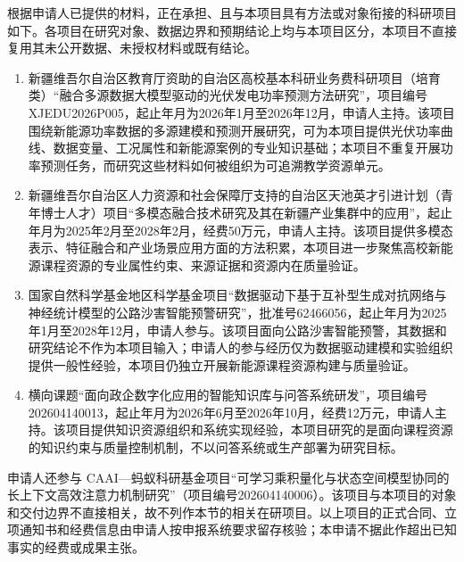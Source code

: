 \justifying
\NSFCBodyText

根据申请人已提供的材料，正在承担、且与本项目具有方法或对象衔接的科研项目如下。各项目在研究对象、数据边界和预期结论上均与本项目区分，本项目不直接复用其未公开数据、未授权材料或既有结论。

\begin{enumerate}
  \item 新疆维吾尔自治区教育厅资助的自治区高校基本科研业务费科研项目（培育类）“融合多源数据大模型驱动的光伏发电功率预测方法研究”，项目编号 XJEDU2026P005，起止年月为2026年1月至2026年12月，申请人主持。该项目围绕新能源功率数据的多源建模和预测开展研究，可为本项目提供光伏功率曲线、数据变量、工况属性和新能源案例的专业知识基础；本项目不重复开展功率预测任务，而研究这些材料如何被组织为可追溯教学资源单元。
  \item 新疆维吾尔自治区人力资源和社会保障厅支持的自治区天池英才引进计划（青年博士人才）项目“多模态融合技术研究及其在新疆产业集群中的应用”，起止年月为2025年2月至2028年2月，经费50万元，申请人主持。该项目提供多模态表示、特征融合和产业场景应用方面的方法积累，本项目进一步聚焦高校新能源课程资源的专业属性约束、来源证据和资源内在质量验证。
  \item 国家自然科学基金地区科学基金项目“数据驱动下基于互补型生成对抗网络与神经统计模型的公路沙害智能预警研究”，批准号62466056，起止年月为2025年1月至2028年12月，申请人参与。该项目面向公路沙害智能预警，其数据和研究结论不作为本项目输入；申请人的参与经历仅为数据驱动建模和实验组织提供一般性经验，本项目仍独立开展新能源课程资源构建与质量验证。
  \item 横向课题“面向政企数字化应用的智能知识库与问答系统研发”，项目编号202604140013，起止年月为2026年6月至2026年10月，经费12万元，申请人主持。该项目提供知识资源组织和系统实现经验，本项目研究的是面向课程资源的知识约束与质量控制机制，不以问答系统或生产部署为研究目标。
\end{enumerate}

申请人还参与 CAAI—蚂蚁科研基金项目“可学习乘积量化与状态空间模型协同的长上下文高效注意力机制研究”（项目编号202604140006）。该项目与本项目的对象和交付边界不直接相关，故不列作本节的相关在研项目。以上项目的正式合同、立项通知书和经费信息由申请人按申报系统要求留存核验；本申请不据此作超出已知事实的经费或成果主张。
